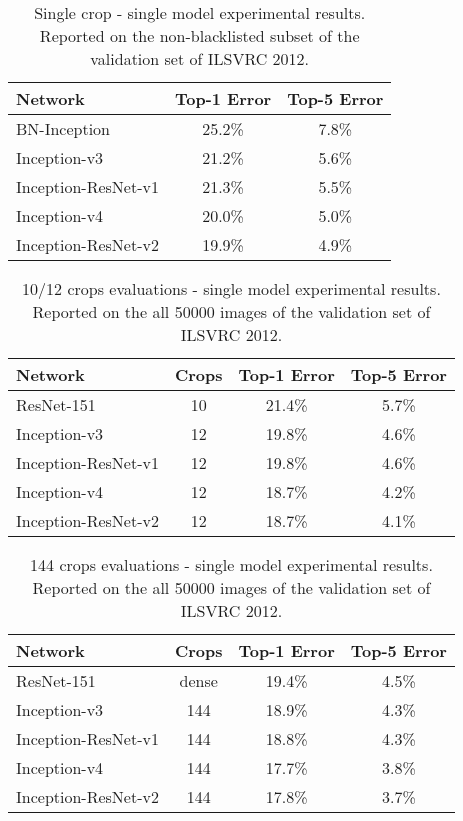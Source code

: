 \documentclass[10pt,twocolumn,letterpaper]{article}
\begin{document}
\begin{table}
{\small
 \begin{center}
   \begin{tabular}[H]{|l|c|c|}
   \hline
   {\bf Network} & {\bf Top-1 Error} & {\bf Top-5 Error} \\
   \hline
   BN-Inception~\cite{ioffe2015batch} & 25.2\% & 7.8\% \\
   Inception-v3~\cite{szegedy2015rethinking} & 21.2\% & 5.6\% \\
   Inception-ResNet-v1 & 21.3\% & 5.5\% \\
   Inception-v4 & 20.0\% & 5.0\% \\
   Inception-ResNet-v2 & 19.9\% & 4.9\% \\
   \hline
   \end{tabular}
 \end{center}
 }
\caption{Single crop - single model experimental results. Reported on the
non-blacklisted subset of the validation set of ILSVRC 2012.}
\label{singlesingle}
\end{table}
\begin{table}
{\small
 \begin{center}
   \begin{tabular}[H]{|l|c|c|c|}
   \hline
   {\bf Network} & {Crops} & {\bf Top-1 Error} & {\bf Top-5 Error} \\
   \hline
   ResNet-151~\cite{he2015deep} & 10 & 21.4\% & 5.7\% \\
   Inception-v3~\cite{szegedy2015rethinking} & 12 & 19.8\% & 4.6\% \\
   Inception-ResNet-v1 & 12 & 19.8\% & 4.6\% \\
   Inception-v4 & 12 & 18.7\% & 4.2\% \\
   Inception-ResNet-v2 & 12 & 18.7\% & 4.1\% \\
   \hline
   \end{tabular}
 \end{center}
 }
\caption{10/12 crops evaluations - single model experimental results.
  Reported on the
all 50000 images of the validation set of ILSVRC 2012.}
\label{multisingle}
\end{table}
\begin{table}
{\small
 \begin{center}
   \begin{tabular}[H]{|l|c|c|c|}
   \hline
   {\bf Network} & {Crops} & {\bf Top-1 Error} & {\bf Top-5 Error} \\
   \hline
   ResNet-151~\cite{he2015deep} & dense & 19.4\% & 4.5\% \\
   Inception-v3~\cite{szegedy2015rethinking} & 144 & 18.9\% & 4.3\% \\
   Inception-ResNet-v1 & 144 & 18.8\% & 4.3\% \\
   Inception-v4 & 144 & 17.7\% & 3.8\% \\
   Inception-ResNet-v2 & 144 & 17.8\% & 3.7\% \\
   \hline
   \end{tabular}
 \end{center}
 }
\caption{144 crops evaluations - single model experimental results.
  Reported on the all 50000 images of the validation set of ILSVRC 2012.}
\label{manysingle}
\end{table}
\end{document}

